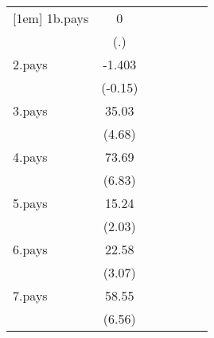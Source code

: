 {\begin{tabular}{l*{6}{c}}
[1em]
1b.pays             &           0         &                     &                     &                     &                     &                     \\
                    &         (.)         &                     &                     &                     &                     &                     \\
[1em]
2.pays              &      -1.403         &                     &                     &                     &                     &                     \\
                    &     (-0.15)         &                     &                     &                     &                     &                     \\
[1em]
3.pays              &       35.03\sym{***}&                     &                     &                     &                     &                     \\
                    &      (4.68)         &                     &                     &                     &                     &                     \\
[1em]
4.pays              &       73.69\sym{***}&                     &                     &                     &                     &                     \\
                    &      (6.83)         &                     &                     &                     &                     &                     \\
[1em]
5.pays              &       15.24\sym{*}  &                     &                     &                     &                     &                     \\
                    &      (2.03)         &                     &                     &                     &                     &                     \\
[1em]
6.pays              &       22.58\sym{**} &                     &                     &                     &                     &                     \\
                    &      (3.07)         &                     &                     &                     &                     &                     \\
[1em]
7.pays              &       58.55\sym{***}&                     &                     &                     &                     &                     \\
                    &      (6.56)         &                     &                     &                     &                     &                     \\

\end{tabular}}
